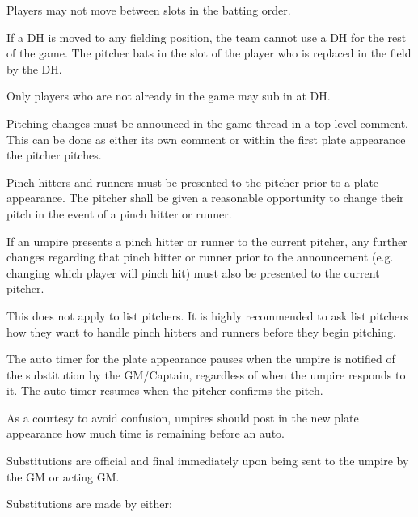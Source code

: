 \begin{deepEnumerate}
\begin{deepEnumerate}
\begin{deepEnumerate}
\begin{deepEnumerate}
				\item Players may not move between slots in the batting order.
				\item If a DH is moved to any fielding position, the team cannot use a DH for the rest of the game. 
				The pitcher bats in the slot of the player who is replaced in the field by the DH.
				\item Only players who are not already in the game may sub in at DH.
			\end{deepEnumerate}
		\end{deepEnumerate}
		\item Pitching changes must be announced in the game thread in a top-level comment.  
		This can be done as either its own comment or within the first plate appearance the pitcher pitches.
		\item Pinch hitters and runners must be presented to the pitcher prior to a plate appearance. 
		The pitcher shall be given a reasonable opportunity to change their pitch in the event of a pinch hitter or runner.
		\begin{deepEnumerate}
			\item If an umpire presents a pinch hitter or runner to the current pitcher, any further changes regarding that pinch hitter or runner prior to the announcement 
			(e.g. changing which player will pinch hit) must also be presented to the current pitcher.
			\item This does not apply to list pitchers. It is highly recommended to ask list pitchers how they want to handle pinch hitters and runners before they begin pitching.
			\item The auto timer for the plate appearance pauses when the umpire is notified of the substitution by the GM/Captain, 
			regardless of when the umpire responds to it. The auto timer resumes when the pitcher confirms the pitch.
			\begin{deepEnumerate}
				\item As a courtesy to avoid confusion, umpires should post in the new plate appearance how much time is remaining before an auto.
			\end{deepEnumerate}
		\end{deepEnumerate}
		\item Substitutions are official and final immediately upon being sent to the umpire by the GM or acting GM.
		\begin{deepEnumerate}
			\item Substitutions are made by either:
			\begin{deepEnumerate}

\end{deepEnumerate}
\end{deepEnumerate}
\end{deepEnumerate}
\end{deepEnumerate}

